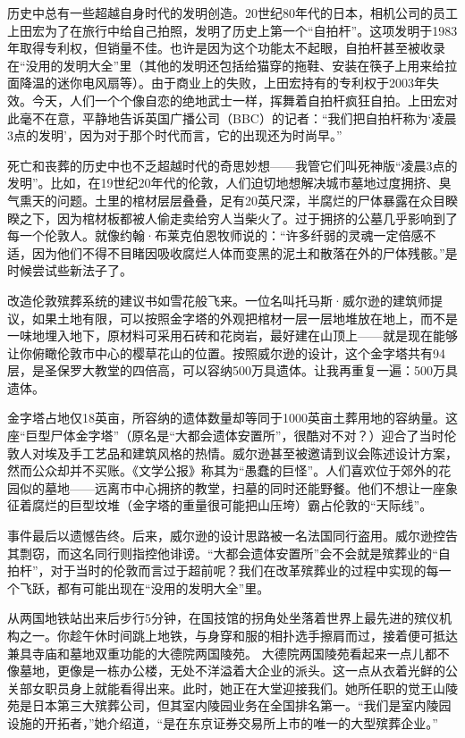 \documentclass[12pt,oneside]{book}
\begin{document}
\begin{bookref}[frametitle={\cite{好好告别}}]
历史中总有一些超越自身时代的发明创造。20世纪80年代的日本，相机公司的员工上田宏为了在旅行中给自己拍照，发明了历史上第一个“自拍杆”。这项发明于1983年取得专利权，但销量不佳。也许是因为这个功能太不起眼，自拍杆甚至被收录在“没用的发明大全”里（其他的发明还包括给猫穿的拖鞋、安装在筷子上用来给拉面降温的迷你电风扇等）。由于商业上的失败，上田宏持有的专利权于2003年失效。今天，人们一个个像自恋的绝地武士一样，挥舞着自拍杆疯狂自拍。上田宏对此毫不在意，平静地告诉英国广播公司（BBC）的记者：“我们把自拍杆称为‘凌晨3点的发明’，因为对于那个时代而言，它的出现还为时尚早。”

死亡和丧葬的历史中也不乏超越时代的奇思妙想——我管它们叫死神版“凌晨3点的发明”。比如，在19世纪20年代的伦敦，人们迫切地想解决城市墓地过度拥挤、臭气熏天的问题。土里的棺材层层叠叠，足有20英尺深，半腐烂的尸体暴露在众目睽睽之下，因为棺材板都被人偷走卖给穷人当柴火了。过于拥挤的公墓几乎影响到了每一个伦敦人。就像约翰·布莱克伯恩牧师说的：“许多纤弱的灵魂一定倍感不适，因为他们不得不目睹因吸收腐烂人体而变黑的泥土和散落在外的尸体残骸。”是时候尝试些新法子了。

改造伦敦殡葬系统的建议书如雪花般飞来。一位名叫托马斯·威尔逊的建筑师提议，如果土地有限，可以按照金字塔的外观把棺材一层一层地堆放在地上，而不是一味地埋入地下，原材料可采用石砖和花岗岩，最好建在山顶上——就是现在能够让你俯瞰伦敦市中心的樱草花山的位置。按照威尔逊的设计，这个金字塔共有94层，是圣保罗大教堂的四倍高，可以容纳500万具遗体。让我再重复一遍：500万具遗体。

金字塔占地仅18英亩，所容纳的遗体数量却等同于1000英亩土葬用地的容纳量。这座“巨型尸体金字塔”（原名是“大都会遗体安置所”，很酷对不对？）迎合了当时伦敦人对埃及手工艺品和建筑风格的热情。威尔逊甚至被邀请到议会陈述设计方案，然而公众却并不买账。《文学公报》称其为“愚蠢的巨怪”。人们喜欢位于郊外的花园似的墓地——远离市中心拥挤的教堂，扫墓的同时还能野餐。他们不想让一座象征着腐烂的巨型坟堆（金字塔的重量很可能把山压垮）霸占伦敦的“天际线”。

事件最后以遗憾告终。后来，威尔逊的设计思路被一名法国同行盗用。威尔逊控告其剽窃，而这名同行则指控他诽谤。“大都会遗体安置所”会不会就是殡葬业的“自拍杆”，对于当时的伦敦而言过于超前呢？我们在改革殡葬业的过程中实现的每一个飞跃，都有可能出现在“没用的发明大全”里。

从两国地铁站出来后步行5分钟，在国技馆的拐角处坐落着世界上最先进的殡仪机构之一。你趁午休时间跳上地铁，与身穿和服的相扑选手擦肩而过，接着便可抵达兼具寺庙和墓地双重功能的大德院两国陵苑。
大德院两国陵苑看起来一点儿都不像墓地，更像是一栋办公楼，无处不洋溢着大企业的派头。这一点从衣着光鲜的公关部女职员身上就能看得出来。此时，她正在大堂迎接我们。她所任职的觉王山陵苑是日本第三大殡葬公司，但其室内陵园业务在全国排名第一。“我们是室内陵园设施的开拓者，”她介绍道，“是在东京证券交易所上市的唯一的大型殡葬企业。”


\end{bookref}
\end{document}

